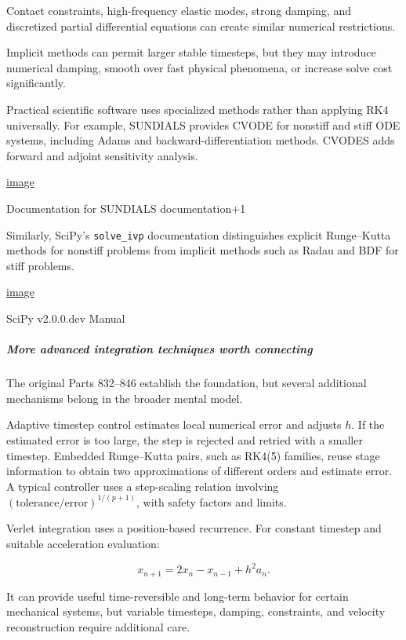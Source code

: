 Contact constraints, high-frequency elastic modes, strong damping, and discretized partial differential equations can create similar numerical restrictions.

Implicit methods can permit larger stable timesteps, but they may introduce numerical damping, smooth over fast physical phenomena, or increase solve cost significantly.

Practical scientific software uses specialized methods rather than applying RK4 universally. For example, SUNDIALS provides CVODE for nonstiff and stiff ODE systems, including Adams and backward-differentiation methods. CVODES adds forward and adjoint sensitivity analysis. 

\href{https://www.google.com/s2/favicons?domain=https://sundials.readthedocs.io&sz=32}{image}

Documentation for SUNDIALS documentation+1

Similarly, SciPy's \texttt{solve\_ivp} documentation distinguishes explicit Runge--Kutta methods for nonstiff problems from implicit methods such as Radau and BDF for stiff problems. 

\href{https://www.google.com/s2/favicons?domain=https://scipy.github.io&sz=32}{image}

SciPy v2.0.0.dev Manual

\subparagraph{More advanced integration techniques worth connecting}\label{02-foundations-ii-ch025-more-advanced-integration-techniques-worth-connecting}

\hypertarget{02-foundations-ii-ch025-more-advanced-integration-techniques-worth-connecting}{}

The original Parts 832--846 establish the foundation, but several additional mechanisms belong in the broader mental model.

Adaptive timestep control estimates local numerical error and adjusts \(h\). If the estimated error is too large, the step is rejected and retried with a smaller timestep. Embedded Runge--Kutta pairs, such as RK4(5) families, reuse stage information to obtain two approximations of different orders and estimate error. A typical controller uses a step-scaling relation involving \((\text{tolerance}/\text{error})^{1/(p+1)}\), with safety factors and limits.

Verlet integration uses a position-based recurrence. For constant timestep and suitable acceleration evaluation:

\[
x_{n+1}=2x_n-x_{n-1}+h^2a_n.
\]

It can provide useful time-reversible and long-term behavior for certain mechanical systems, but variable timesteps, damping, constraints, and velocity reconstruction require additional care.

